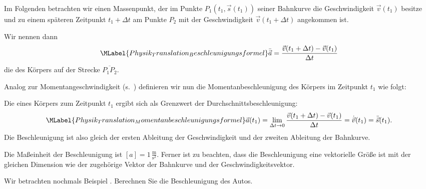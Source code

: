 \begin{MContent}

Im Folgenden betrachten wir einen Massenpunkt, der im Punkte $P_1(t_1,\vec{s}(t_1))$ seiner Bahnkurve die Geschwindigkeit $\vec{v}(t_1)$ besitze und zu einem sp\"ateren Zeitpunkt $t_1+\Delta t$ am Punkte $P_2$ mit der Geschwindigkeit $\vec{v}(t_1+\Delta t)$ angekommen ist.
\begin{MInfo}
    Wir nennen dann 
     \begin{equation}\MLabel{Physik_Translation_Beschleunigungsformel}
   \bar{\vec{a}}=\frac{\vec{v}(t_1+\Delta t)-\vec{v}(t_1)}{\Delta t}
   \end{equation} die  des K\"orpers auf der Strecke $\overline{P_1P_2}$. 
  \end{MInfo}
  
  Analog zur Momentangeschwindigkeit (s.~) definieren wir nun die Momentanbeschleunigung des K\"orpers im Zeitpunkt $t_1$ wie folgt: 
  
   \begin{MInfo}
       Die  eines K\"orpers zum Zeitpunkt $t_1$ ergibt sich als Grenzwert der Durchschnittsbeschleunigung: 
       \begin{equation}\MLabel{Physik_Translation_Momentanbeschleunigungsformel}
      \vec{a}(t_1)=\lim_{\Delta t\rightarrow 0}\frac{\vec{v}(t_1+\Delta t)-\vec{v}(t_1)}{\Delta t}=\dot{\vec{v}}(t_1)=\ddot{\vec{s}}(t_1).
      \end{equation} 
      Die Beschleunigung ist also gleich der ersten Ableitung der Geschwindigkeit und der zweiten Ableitung der Bahnkurve.
     \end{MInfo}
     
     Die Ma{\ss}einheit der Beschleunigung ist $[a]=1\,\frac{\text{m}}{\text{s}^2}$. Ferner ist zu beachten, dass die Beschleunigung eine vektorielle Gr\"o{\ss}e ist mit der gleichen Dimension wie der zugeh\"orige Vektor der Bahnkurve und der Geschwindigkeitsvektor.
     
     
     
     \begin{MExercise}
     Wir betrachten nochmals Beispiel . Berechnen Sie die Beschleunigung des Autos.
     

\end{MExercise}
\end{MContent}

